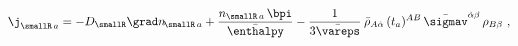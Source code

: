 \begin{equation}
\label{eq:susy4R}
    \j_{\smallR \,a} =
              -D_\smallR \grad n_{\!\smallR \,a}
              + \frac{n_{\smallR \,a} \, \bpi }{ \bar\enthalpy}
              - \frac{1}{3\bar\vareps} \>
              \bar\rho_{A \dot\alpha} \, (t_a)^{AB} \,
	      \bar\sigmav^{\dot\alpha \beta}
              \, \rho_{B \beta} \ ,
\end{equation}

